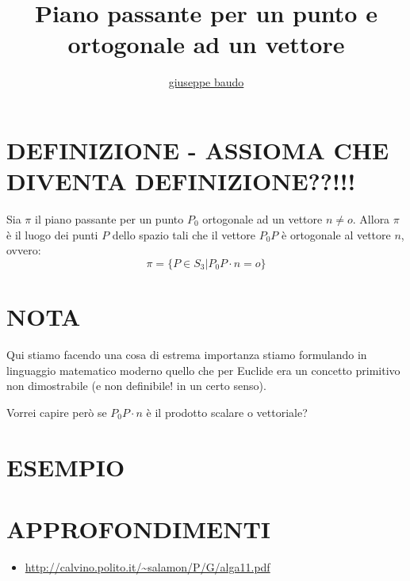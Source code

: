 \documentclass[a4paper,10pt]{article}
\title{Piano passante per un punto e ortogonale ad un vettore}
\author{\href{http://www.baudo.hol.es}{giuseppe baudo}}
\begin{document}
\maketitle

\section{DEFINIZIONE - ASSIOMA CHE DIVENTA DEFINIZIONE??!!!}
Sia $\pi$ il piano passante per un punto $P_0$ ortogonale ad un vettore $n \ne o$. Allora $\pi$ è il luogo
dei punti $P$ dello spazio tali che il vettore $P_0P$ è ortogonale al vettore $n$, ovvero:
\[
 \pi = \{ P \in S_3 | P_0P \cdot n = o  \} 
\]


\section{NOTA}
Qui stiamo facendo una cosa di estrema importanza stiamo formulando in linguaggio matematico moderno quello che per Euclide era un
concetto primitivo non dimostrabile (e non definibile! in un certo senso).

Vorrei capire però se $P_0P \cdot n$ è il prodotto scalare o vettoriale?

\section{ESEMPIO}

\section{APPROFONDIMENTI}
\begin{itemize}
 \item \url{http://calvino.polito.it/~salamon/P/G/alga11.pdf}
\end{itemize}
\end{document}

